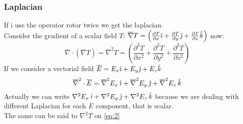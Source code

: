 \subsubsection*{Laplacian}
If i use the operator rotor twice we get the laplacian.\\
Consider the gradient of a scalar field $T$: $\overline{\nabla}T=\left(\frac{\partial T}{\partial x}\hat{\imath}+\frac{\partial T}{\partial y}\hat{\jmath}+\frac{\partial T}{\partial z}\hat{\mathnormal{k}}\right)$ now:
\begin{equation}\label{eq:2}
\overline{\nabla}\cdot(\overline{\nabla}T)=\overline{\nabla}^2T=\left(\frac{\partial^2 T}{\partial x^2}+\frac{\partial^2 T}{\partial y^2}+\frac{\partial^2 T}{\partial z^2}\right)
\end{equation}
If we consider a vectorial field $\overline{E}=E_x \hat{\imath} + E_y \hat{\jmath} + E_z \hat{\mathnormal{k}}$
\begin{equation}
\overline{\nabla}^2\cdot \overline{E}= \overline{\nabla}^2E_x\,\hat{\imath}+\overline{\nabla}^2E_y\,\hat{\jmath}+\overline{\nabla}^2E_z\,\hat{\mathnormal{k}}
\end{equation}
Actually we can write $\nabla^2E_x\,\hat{\imath}+\nabla^2E_y\,\hat{\jmath}+\nabla^2E_z\,\hat{\mathnormal{k}}$ because we are dealing with different Laplacian for each $E$ component, that is scalar.\\
The same can be said to $\nabla^2 T$ on \cref{eq:2}
